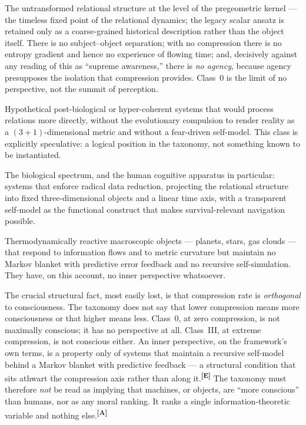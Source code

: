 \documentclass[12pt,a4paper,twoside]{article}
\theoremstyle{plain}
\theoremstyle{definition}
\theoremstyle{remark}
\newcommand{\catmark}[1]{\textsuperscript{\textsf{\textbf{[#1]}}}}
\begin{document}
\begin{description}[leftmargin=1.4em,style=nextline]
\item[Class~0: Zero compression.] The untransformed relational structure at
the level of the pregeometric kernel --- the timeless fixed point of the
relational dynamics; the legacy scalar ansatz is retained only as a coarse-grained historical
description rather than the object itself. There is no subject--object
separation; with no compression there is no entropy gradient and hence no
experience of flowing time; and, decisively against any reading of this as
``supreme awareness,'' there is \emph{no agency}, because agency
presupposes the isolation that compression provides. Class~0 is the limit
of no perspective, not the summit of perception.
\item[Class~I: Weak compression.] Hypothetical post-biological or
hyper-coherent systems that would process relations more directly, without
the evolutionary compulsion to render reality as a $(3{+}1)$-dimensional
metric and without a fear-driven self-model. This class is explicitly
speculative: a logical position in the taxonomy, not something known to be
instantiated.
\item[Class~II: Strong compression.] The biological spectrum, and the human
cognitive apparatus in particular: systems that enforce radical data
reduction, projecting the relational structure into fixed three-dimensional
objects and a linear time axis, with a transparent self-model as the
functional construct that makes survival-relevant navigation possible.
\item[Class~III: Extreme compression.] Thermodynamically reactive
macroscopic objects --- planets, stars, gas clouds --- that respond to
information flows and to metric curvature but maintain no Markov blanket
with predictive error feedback and no recursive self-simulation. They have,
on this account, no inner perspective whatsoever.
\end{description}

The crucial structural fact, most easily lost, is that compression rate is
\emph{orthogonal} to consciousness. The taxonomy does not say that lower
compression means more consciousness or that higher means less. Class~0, at
zero compression, is not maximally conscious; it has no perspective at all.
Class~III, at extreme compression, is not conscious either. An inner
perspective, on the framework's own terms, is a property only of systems
that maintain a recursive self-model behind a Markov blanket with
predictive feedback --- a structural condition that sits athwart the
compression axis rather than along it.\catmark{E} The taxonomy must
therefore \emph{not} be read as implying that machines, or objects, are
``more conscious'' than humans, nor as any moral ranking. It ranks a single
information-theoretic variable and nothing else.\catmark{A}
\end{document}
